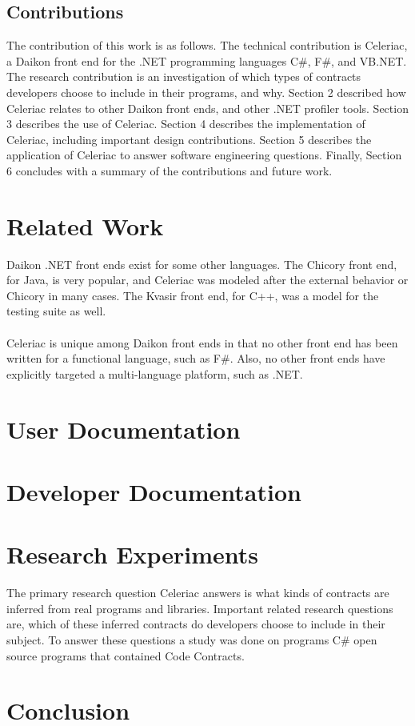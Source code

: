 \documentclass{article}
\begin{document}
\subsection{Contributions}
The contribution of this work is as follows. The technical contribution is Celeriac, a Daikon front end for the .NET programming languages C\#, F\#, and VB.NET. The research contribution is an investigation of which types of contracts developers choose to include in their programs, and why. Section 2 described how Celeriac relates to other Daikon front ends, and other .NET profiler tools. Section 3 describes the use of Celeriac. Section 4 describes the implementation of Celeriac, including important design contributions. Section 5 describes the application of Celeriac to answer software engineering questions. Finally, Section 6 concludes with a summary of the contributions and future work.

\section{Related Work}
Daikon .NET front ends exist for some other languages. The Chicory front end, for Java, is very popular, and Celeriac was modeled after the external behavior or Chicory in many cases. The Kvasir front end, for C++, was a model for the testing suite as well.
\\ \\
Celeriac is unique among Daikon front ends in that no other front end has been written for a functional language, such as F\#. Also, no other front ends have explicitly targeted a multi-language platform, such as .NET.

\section{User Documentation}

\section{Developer Documentation}

\section{Research Experiments}
The primary research question Celeriac answers is what kinds of contracts are inferred from real programs and libraries. Important related research questions are, which of these inferred contracts do developers choose to include in their subject. To answer these questions a study was done on programs C\# open source programs that contained Code Contracts.




\section{Conclusion}

\newpage


\end{document}
